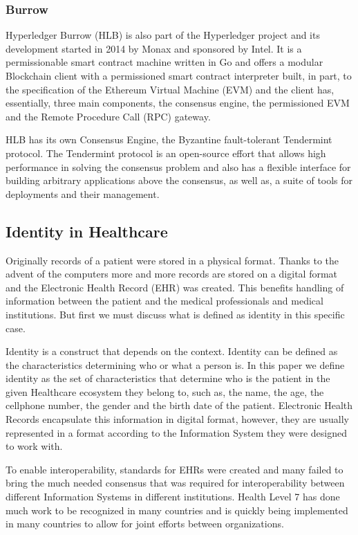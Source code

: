 \subsubsection{Burrow}

Hyperledger Burrow (HLB) is also part of the Hyperledger project and its
development started in 2014 by Monax and sponsored by Intel. It is a
permissionable smart contract machine written in Go and offers a modular
Blockchain client with a permissioned smart contract interpreter built, in
part, to the specification of the Ethereum Virtual Machine (EVM) and the client
has, essentially, three main components, the consensus engine, the permissioned
EVM and the Remote Procedure Call (RPC) gateway.
\cite{Kuhlman2017,HyperledgerBurrow2017}

HLB has its own Consensus Engine, the Byzantine fault-tolerant Tendermint
protocol.  The Tendermint protocol is an open-source effort that allows high
performance in solving the consensus problem and also has a flexible interface
for building arbitrary applications above the consensus, as well as, a suite of
tools for deployments and their management. \cite{Buchman2016}
%

\subsection{Identity in Healthcare} Originally records of a patient were stored
in a physical format.  Thanks to the advent of the computers more and more
records are stored on a digital format and the Electronic Health Record (EHR)
was created.  This benefits handling of information between the patient and the
medical professionals and medical institutions. But first we must discuss what
is defined as identity in this specific case.

Identity is a construct that depends on the context.  Identity can be defined
as the characteristics determining who or what a person is.  In this paper we
define identity as the set of characteristics that determine who is the patient
in the given Healthcare ecosystem they belong to, such as, the name, the age,
the cellphone number, the gender and the birth date of the patient.  Electronic
Health Records encapsulate this information in digital format, however, they
are usually represented in a format according to the Information System they
were designed to work with.

To enable interoperability, standards for EHRs were created and many failed to
bring the much needed consensus that was required for interoperability between
different Information Systems in different institutions.  Health Level 7 has
done much work to be recognized in many countries and is quickly being
implemented in many countries to allow for joint efforts between organizations.

